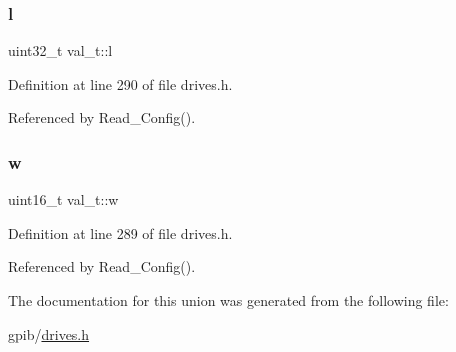 \subsubsection{\texorpdfstring{l}{l}}
{\footnotesize\ttfamily uint32\+\_\+t val\+\_\+t\+::l}



Definition at line 290 of file drives.\+h.



Referenced by Read\+\_\+\+Config().

\mbox{\label{unionval__t_a35ceb0f111824a2835370671131c38c0}} 
\subsubsection{\texorpdfstring{w}{w}}
{\footnotesize\ttfamily uint16\+\_\+t val\+\_\+t\+::w}



Definition at line 289 of file drives.\+h.



Referenced by Read\+\_\+\+Config().



The documentation for this union was generated from the following file\+:\begin{DoxyCompactItemize}
\item 
gpib/\hyperlink{drives_8h}{drives.\+h}\end{DoxyCompactItemize}
